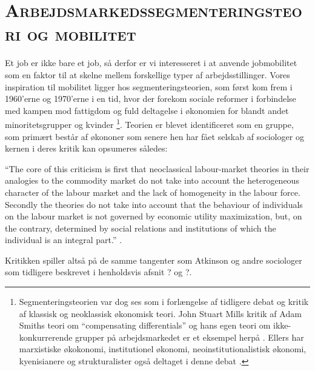 

\newpage \section{\textsc{Arbejdsmarkedssegmenteringsteori og mobilitet} \label{}}

Et job er ikke bare et job, så derfor er vi interesseret i at anvende jobmobilitet som en faktor til at skelne mellem forskellige typer af arbejdsstillinger. Vores inspiration til mobilitet ligger hos segmenteringsteorien, som først kom frem i 1960'erne og 1970'erne i en tid, hvor der forekom sociale reformer i forbindelse med kampen mod fattigdom og fuld deltagelse i økonomien for blandt andet minoritetsgrupper og kvinder \parencite[1216]{Cain1976}\footnote{Segmenteringsteorien var dog ses som i forlængelse af tidligere debat og kritik af klassisk og neoklassisk økonomisk teori. John Stuart Mills kritik af Adam Smiths teori om “compensating differentials” og hans egen teori om ikke-konkurrerende grupper på arbejdsmarkedet er et eksempel herpå \parencite[1224]{Cain1976}. Ellers har marxistiske økokonomi, institutionel økonomi, neoinstitutionalistisk økonomi, kyenisianere og strukturalister også deltaget i denne debat \parencite[1226ff]{Cain1976}.}. Teorien er blevet identificeret som en gruppe, som primært består af økononer som senere hen har fået selskab af sociologer og kernen i deres kritik kan opsumeres således: 

\begin{displayquote} “The core of this criticism is first that neoclassical labour-market theories in their analogies to the commodity market do not take into account the heterogeneous character of the labour market and the lack of homogeneity in the labour force. Secondly the theories do not take into account that the behaviour of individuals on the labour market is not governed by economic utility maximization, but, on the contrary, determined by social relations and institutions of which the individual is an integral part.” \parencite[171]{Boje1986}. \end{displayquote}

Kritikken spiller altså på de samme tangenter som Atkinson og andre sociologer som tidligere beskrevet i henholdsvis afsnit ? og ?.


